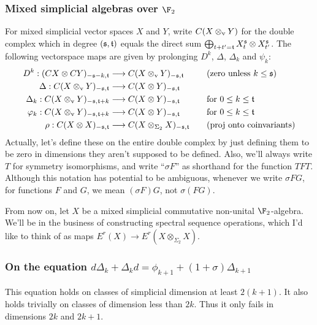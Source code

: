 \documentclass[10pt]{article}
\newcommand{\twist}{\sigma}
\begin{document}
\begin{letter to Dwyer}
\subsubsection*{Mixed simplicial algebras over $\F_2$}
For mixed simplicial vector spaces $X$ and $Y$, write $C(X\otimes_\textup{v}Y)$ for the double complex which in degree $(\mathfrak{s},\mathfrak{t})$ equals the direct sum $\bigoplus_{t+t'=\mathfrak{t}}X_t^{\mathfrak{s}}\otimes X_{t'}^{\mathfrak{s}}$. The following vectorspace maps are given by prolonging $D^k$, $\Delta$, $\Delta_k$ and $\psi_k$:
\begin{align*}
{D}^k:(CX\otimes CY)_{-\mathfrak{s}-k,\mathfrak{t}}&\longrightarrow C(X\otimes_\textup{v}Y)_{-\mathfrak{s},\mathfrak{t}}&\quad&\textup{(zero unless $k\leq \mathfrak{s}$)}\\
{\Delta}:C(X\otimes_\textup{v} Y)_{-\mathfrak{s},\mathfrak{t}}&\longrightarrow C(X\otimes Y)_{-\mathfrak{s},\mathfrak{t}}\\
{\Delta}_k:C(X\otimes_\textup{v} Y)_{-\mathfrak{s},\mathfrak{t}+k}&\longrightarrow C(X\otimes Y)_{-\mathfrak{s},\mathfrak{t}}&\quad&\textup{for $0\leq k\leq \mathfrak{t}$}\\
{\varphi}_k:C(X\otimes_\textup{v} Y)_{-\mathfrak{s},\mathfrak{t}+k}&\longrightarrow C(X\otimes Y)_{-\mathfrak{s},\mathfrak{t}}&\quad&\textup{for $0\leq k\leq \mathfrak{t}$}\\
{\rho}:C(X\otimes X)_{-\mathfrak{s},\mathfrak{t}}&\longrightarrow C(X\otimes_{\Sigma_2} X)_{-\mathfrak{s},\mathfrak{t}}&\quad&\textup{(proj onto coinvariants)}\\
\end{align*}
Actually, let's define these on the entire double complex by just defining them to be zero in dimensions they aren't supposed to be defined. Also, we'll always write $T$ for symmetry isomorphisms, and write ``$\twist F$'' as shorthand for the function $TFT$. Although this notation has potential to be ambiguous, whenever we write $\sigma FG$, for functions $F$ and $G$, we mean $(\sigma F)G$, not $\sigma(FG)$.

From now on, let $X$ be a mixed simplicial commutative non-unital $\F_2$-algebra. We'll be in the business of constructing spectral sequence operations, which I'd like to think of as maps $E^r(X)\to E^r(X\otimes_{\Sigma_2}X)$.

\subsubsection*{On the equation $d\Delta_k+\Delta_kd=\phi_{k+1}+(1+\twist)\Delta_{k+1}$}
This equation holds on classes of simplicial dimension at least $2(k+1)$. It also holds trivially on classes of dimension less than $2k$. Thus it only fails in dimensions $2k$ and $2k+1$.


\end{letter to Dwyer}
\end{document}
